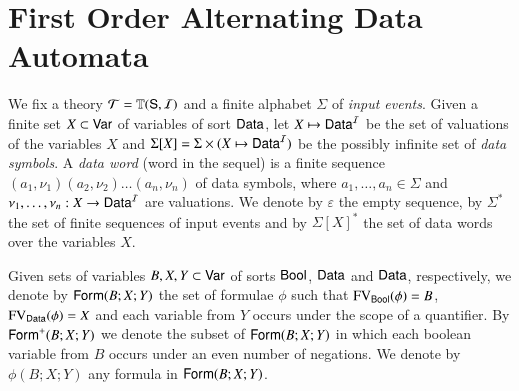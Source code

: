\documentclass{llncs}
\begin{document}
\section{First Order Alternating Data Automata}

We fix a theory $\mathcal{T} = \mathbb{T}(\mathsf{S},\mathcal{I})$ and a finite alphabet $\Sigma$
of \emph{input events}. Given a finite set $X \subset \mathsf{Var}$ of
variables of sort $\mathsf{Data}$, let $X \mapsto \mathsf{Data}^{\mathcal{I}}$ be the set of
valuations of the variables $X$ and $\Sigma[X] = \Sigma \times (X
\mapsto \mathsf{Data}^{\mathcal{I}})$ be the possibly infinite set of \emph{data
  symbols}. A \emph{data word} (word in the sequel) is a finite
sequence $(a_1,\nu_1)(a_2,\nu_2) \ldots (a_n,\nu_n)$ of data symbols,
where $a_1,\ldots,a_n \in \Sigma$ and $\nu_1,\ldots,\nu_n : X
\rightarrow \mathsf{Data}^{\mathcal{I}}$ are valuations. We denote by $\varepsilon$ the
empty sequence, by $\Sigma^*$ the set of finite sequences of input
events and by $\Sigma[X]^*$ the set of data words over the variables
$X$.

Given sets of variables $B,X,Y \subset \mathsf{Var}$ of sorts $\mathsf{Bool}$,
$\mathsf{Data}$ and $\mathsf{Data}$, respectively, we denote by $\mathsf{Form}(B;X;Y)$ the set
of formulae $\phi$ such that $\mathrm{FV}_{\mathsf{Bool}}(\phi) = B$, $\mathrm{FV}_{\mathsf{Data}}(\phi)
= X$ and each variable from $Y$ occurs under the scope of a
quantifier. By $\mathsf{Form}^+(B;X;Y)$ we denote the subset of $\mathsf{Form}(B;X;Y)$
in which each boolean variable from $B$ occurs under an even number of
negations. We denote by $\phi(B;X;Y)$ any formula in $\mathsf{Form}(B;X;Y)$.
\end{document}
